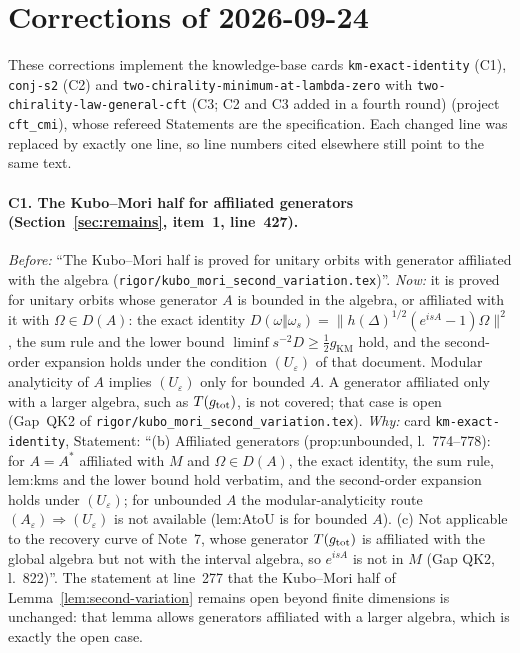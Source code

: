 \documentclass[11pt]{article}
\theoremstyle{accent}
\theoremstyle{definition}
\begin{document}
\section*{Corrections of 2026-09-24}
{\sloppy
These corrections implement the knowledge-base cards \texttt{km-exact-identity} (C1), \texttt{conj-s2} (C2) and \texttt{two-chirality-minimum-at-lambda-zero} with \texttt{two-chirality-law-general-cft} (C3; C2 and C3 added in a fourth round) (project
\texttt{cft\_cmi}), whose refereed Statements are the specification.  Each changed line was replaced by
exactly one line, so line numbers cited elsewhere still point to the same text.
\paragraph{C1. The Kubo--Mori half for affiliated generators (Section~\ref{sec:remains}, item~1,
line~427).}
\emph{Before:} ``The Kubo--Mori half is proved for unitary orbits with generator affiliated with the
algebra (\texttt{rigor/kubo\_mori\_second\_variation.tex})''.
\emph{Now:} it is proved for unitary orbits whose generator \(A\) is bounded in the algebra, or
affiliated with it with \(\Omega\in D(A)\): the exact identity
\(D(\omega\Vert\omega_s)=\|h(\Delta)^{1/2}(e^{isA}-1)\Omega\|^2\), the sum rule and the lower bound
\(\liminf s^{-2}D\ge\frac12g_{\mathrm{KM}}\) hold, and the second-order expansion holds under the
condition \((U_\varepsilon)\) of that document.  Modular analyticity of \(A\) implies
\((U_\varepsilon)\) only for bounded \(A\).  A generator affiliated only with a larger algebra, such as
\(T(g_{\rm tot})\), is not covered; that case is open (Gap~QK2 of
\texttt{rigor/kubo\_mori\_second\_variation.tex}).
\emph{Why:} card \texttt{km-exact-identity}, Statement: ``(b) Affiliated generators (prop:unbounded,
l.~774--778): for \(A=A^*\) affiliated with \(M\) and \(\Omega\in D(A)\), the exact identity, the sum
rule, lem:kms and the lower bound hold verbatim, and the second-order expansion holds under
\((U_\varepsilon)\); for unbounded \(A\) the modular-analyticity route \((A_\varepsilon)\Rightarrow
(U_\varepsilon)\) is not available (lem:AtoU is for bounded \(A\)).  (c) Not applicable to the
recovery curve of Note~7, whose generator \(T(g_{\rm tot})\) is affiliated with the global algebra but
not with the interval algebra, so \(e^{isA}\) is not in \(M\) (Gap QK2, l.~822)''.  The statement
at line~277 that the Kubo--Mori half of Lemma~\ref{lem:second-variation} remains open beyond finite
dimensions is unchanged: that lemma allows generators affiliated with a larger algebra, which is
exactly the open case.
}
\end{document}
